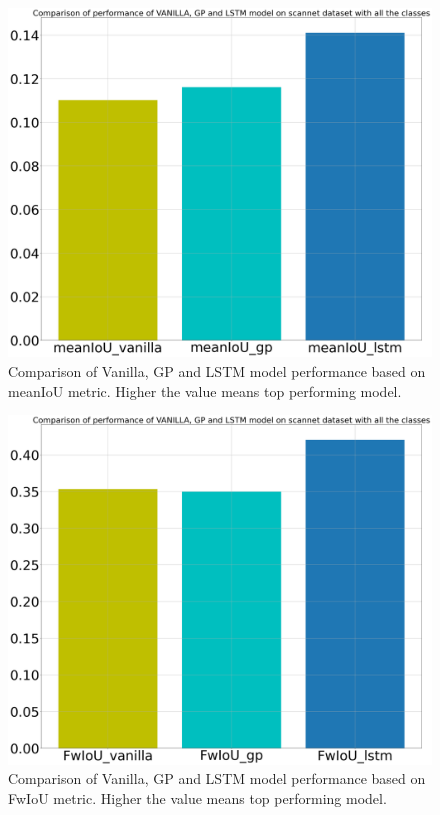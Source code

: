 	\begin{figure}
		\centering
		\includegraphics[width=12cm]{images/all_classes_meanIoU.png}
		\caption{Comparison of Vanilla, GP and LSTM model performance based on meanIoU metric. Higher the value means top performing model.}
		\label{fig:unet_model_metric_comparison_all_classes}
	\end{figure}

	\begin{figure}
		\centering
		\includegraphics[width=12cm]{images/all_classes_FwIoU.png}
		\caption{Comparison of Vanilla, GP and LSTM model performance based on FwIoU metric. Higher the value means top performing model.}
		\label{fig:unet_model_metric_comparison_all_classes}
	\end{figure}
	
